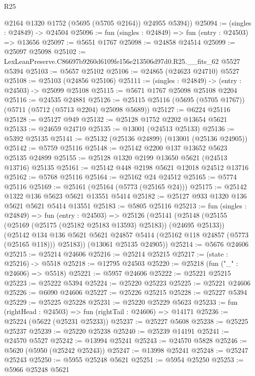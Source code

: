 \begin{lexlean}{R25}
\begin{coremodule}
        @2164
        @1320
        @1752
        (@5695 (@5705 @2164))
        @24955
        @5394))
@25094 := (singles : @24849) -> @24504
@25096 := fun (singles : @24849) => fun (entry : @24503) => @13656
@25097 := @5651 @1767
@25098 := @24858 @24514
@25099 := @25097 @25098
@25102 := LexLeanPreserve.C86697b9260d6109fe156e213506d97d0.R25.__fits_62 @5527 @5394
@25103 := @5657 @25102
@25106 := @24865 (@24623 @24710) @5527
@25108 := @25103 (@24856 @25106)
@25111 := (singles : @24849) -> (entry : @24503) -> @25099 @25108
@25115 := @5671 @1767 @25098 @25108 @2204
@25116 := @24535 @24881
@25126 := @25115 @25116 (@5695 (@5705 @1767)) (@5711 (@5712 (@5713 @2204) @25098 @5689))
@25127 := @6224 @25116
@25128 := @25127 @949
@25132 := @25128 @1752 @2202 @13654 @5621
@25133 := @24659 @24710
@25135 := @13001 (@24513 @25133)
@25136 := @5392 @25135
@25141 := @25132 (@25136 @24899) (@13001 (@25136 @24905))
@25142 := @5759 @25116
@25148 := @25142 @2200 @137 @13652 @5623 @25135 @24899
@25155 := @25128 @1320 @2199 @13650 @5621 (@24513 @13716) @25135
@25161 := @25142 @448 @2198 @5621 @12018 @24512 @13716
@25162 := @5768 @25116
@25164 := @25162 @24 @24512
@25165 := @5774 @25116
@25169 := @25161 (@25164 (@5773 (@25165 @24)))
@25175 := @25142 @1322 @136 @5623 @5621 @13551 @5414
@25182 := @25127 @933 @1320 @136 @5621 @5621 @5414 @13551
@25183 := @5805 @25116
@25213 := fun (singles : @24849) =>
  fun (entry : @24503) =>
  @25126
    (@25141
      (@25148
        (@25155 (@25169 (@25175 (@25182 @25183 @13593) @25183)) (@24695 @25133))
        (@25142
          @134
          @136
          @5621
          @5621
          @24857
          @5414
          (@25162 @118 @24857 (@5773 (@25165 @118)))
          @25183))
      (@13061 @25135 @24905))
@25214 := @5676 @24606
@25215 := @25214 @24606
@25216 := @25214 @25215
@25217 := (state : @25216) -> @5518
@25218 := @12795 @24503
@25220 := @25218 (fun ("_" : @24606) => @5518)
@25221 := @5957 @24606
@25222 := @25221 @25215
@25223 := @25222 @5394
@25224 := @25220 @25223
@25225 := @25221 @24606
@25226 := @6090 @24606
@25227 := @25226 @25215
@25228 := @25227 @5394
@25229 := @25225 @25228
@25231 := @25220 @25229 @5623
@25233 := fun (rightHead : @24503) => fun (rightTail : @24606) => @14171
@25236 := @25224 (@5622 (@25231 @25233))
@25237 := @25227 @5608
@25238 := @25225 @25237
@25239 := @25220 @25238
@25240 := @25239 @14191
@25241 := @24570 @5527
@25242 := @13994 @25241
@25243 := @24570 @5828
@25246 := @5620 (@5950 (@25242 @25243))
@25247 := @13998 @25241
@25248 := @25247 @25243
@25250 := @5955 @25248 @5621
@25251 := @5954 @25250
@25253 := @5966 @25248 @5621

\end{coremodule}
\end{lexlean}
